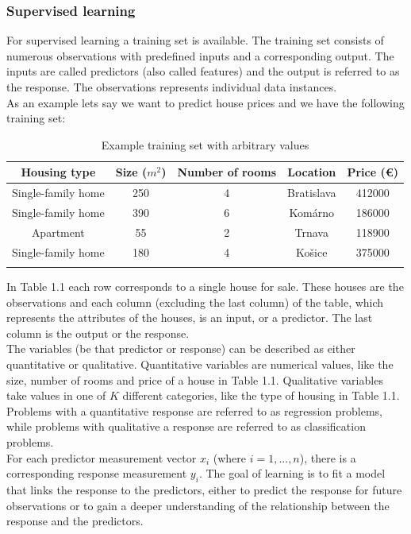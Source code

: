 \documentclass[a4paper,oneside,onecolumn,12pt]{LegrandOrangeBook}
\begin{document}
			\subsubsection{Supervised learning}
			For supervised learning a training set is available. The training set consists of numerous observations with predefined inputs and a corresponding output. The inputs are called predictors (also called features) and the output is referred to as the response. The observations represents individual data instances. \cite{TESL}\\
			As an example lets say we want to predict house prices and we have the following training set:\\
			\begin{table}[H]
			\begin{center}
			\begin{tabular}{|c|c|c|c||c|}
				\hline
				\textbf{Housing type} & \textbf{Size ($m^2$)} & \textbf{Number of rooms} & \textbf{Location} & \textbf{Price (€)}\\
				\hline
				Single-family home & 250 & 4 & Bratislava & 412000\\
				\hline
				Single-family home & 390 & 6 & Komárno & 186000\\ 
				\hline
				Apartment & 55 & 2 & Trnava & 118900\\
				\hline
				Single-family home & 180 & 4 & Košice & 375000\\
				\hline
				\multicolumn{5}{|c|}{\cdots} \\
				\hline
			\end{tabular}
			\end{center}
			\caption{Example training set with arbitrary values}
			\end{table}
			In Table 1.1 each row corresponds to a single house for sale. These houses are the observations and each column (excluding the last column) of the table, which represents the attributes of the houses, is an input, or a predictor. The last column is the output or the response.\\
			The variables (be that predictor or response) can be described as either quantitative or qualitative. Quantitative variables are numerical values, like the size, number of rooms and price of a house in Table 1.1. Qualitative variables take values in one of $K$ different categories, like the type of housing in Table 1.1. Problems with a quantitative response are referred to as regression problems, while problems with qualitative a response are referred to as classification problems. \cite{AISL}\\
			For each predictor measurement vector $x_i$ (where $i = 1, ..., n$), there is a corresponding response measurement $y_i$. The goal of learning is to fit a model that links the response to the predictors, either to predict the response for future observations or to gain a deeper understanding of the relationship between the response and the predictors. \cite{AISL}\\
\end{document}
